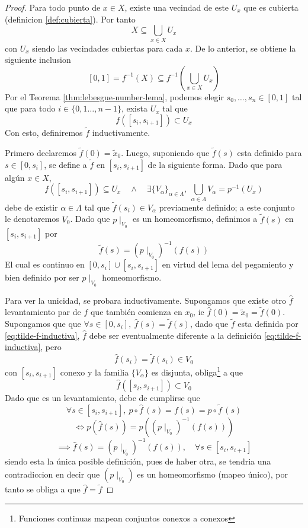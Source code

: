 \begin{proof}
  Para todo punto de \(x \in X\), existe una vecindad de este \(U_x\)
  que es cubierta (definicion \ref{def:cubierta}). Por tanto
  \[ X \subseteq \bigcup_{x \in X} U_x\]
  con \(U_x\) siendo las vecindades cubiertas para cada \(x\). De lo
  anterior, se obtiene la siguiente inclusion
  \[ [0,1] = f^{-1} \left( X \right) \subseteq f^{-1} \left( \bigcup_{x
    \in X} U_x \right) \]
  Por el Teorema \ref{thm:lebesgue-number-lema}, podemos elegir
  \(s_0,\dotsc,s_n \in [0,1]\) tal que para todo \(i \in \{0,1 \dotsc,
  n-1\}\), exista \(U_x\) tal que
  \[f \left( [s_i, s_{i+1}] \right) \subset U_x \]
  Con esto, definiremos \(\tilde f\) inductivamente.

  Primero declaremos \(\tilde f (0) = \tilde x _0\). Luego, suponiendo
  que \(\tilde f (s)\) esta definido para \(s \in [0, s_i]\), se
  define a \(\tilde f \) en \([s_i, s_{i+1}]\) de la siguiente forma.
  Dado que para algún \(x \in X\),
  \[
    f \left( [s_i, s_{i+1}] \right) \subseteq U_x \quad \land \quad
    \exists \{V_\alpha\}_{\alpha \in \Lambda},\ \bigcup_{\alpha \in \Lambda}
    V_\alpha = p^{-1} (U_x)
  \]
  debe de existir \(\alpha \in \Lambda\) tal que \(\tilde f (s_i) \in
  V_\alpha\) previamente definido; a este conjunto le denotaremos
  \(V_0\). Dado que \(p \mid_{V_0}\) es un homeomorfismo, definimos a
  \(\tilde f (s)\) en \([s_i, s_{i+1}]\) por
  \begin{equation} \label{eq:tilde-f-inductiva}
    \tilde f (s) = \left( p \mid _{V_0} \right)^{-1} \left( f(s) \right)
  \end{equation}
  El cual es continuo en \([0, s_i] \cup [s_i, s_{i+1}]\) en virtud del
  lema del pegamiento y bien definido por ser \( p \mid _{V_0} \)
  homeomorfismo.

  Para ver la unicidad, se probara inductivamente. Supongamos que existe
  otro \(\hat{f}\) levantamiento par de \(f\) que también
  comienza en \(x_0\), ie \(\hat{f} (0) = \tilde x _0 = \tilde f
  (0)\). Supongamos que que \(\forall s \in [0, s_i],\ \hat{f}
  (s) = \tilde f (s)\), dado que \(\tilde f\) esta definida por
  \eqref{eq:tilde-f-inductiva}, \(\hat f\) debe ser
  eventualmente diferente a la definición \eqref{eq:tilde-f-inductiva},
  pero
  \[\hat f (s_i) = \tilde f (s_i) \in V_0\]
  con \([s_i, s_{i+1}]\) conexo y la familia \(\{V_\alpha\}\)
  es disjunta, obliga\footnote{Funciones continuas mapean conjuntos
    conexos a conexos} a que
  \[ \hat f \left( [s_i, s_{i+1}] \right) \subset V_0 \]
  Dado que es un levantamiento, debe de cumplirse que
  \[\forall s \in [s_i, s_{i+1}],\ p \circ \hat f \, (s) =
    f(s) = p \circ \tilde f \, (s) \]
  \[ \iff p \left( \hat f (s) \right) = p \left( \left( p \mid_{V_0}
      \right) ^{-1} \left( f (s) \right) \right)\]
  \[ \implies \hat f (s) = (p \mid_{V_0})^{-1} (f (s)), \quad \forall s
      \in [s_i, s_{i+1}]\]
  siendo esta la única posible definición, pues de haber otra,
  se tendria una contradiccion en decir que \((p \mid_{V_0})\) es un
  homeomorfismo (mapeo único), por tanto se obliga a que \( \hat f =
  \tilde f\)
\end{proof}
